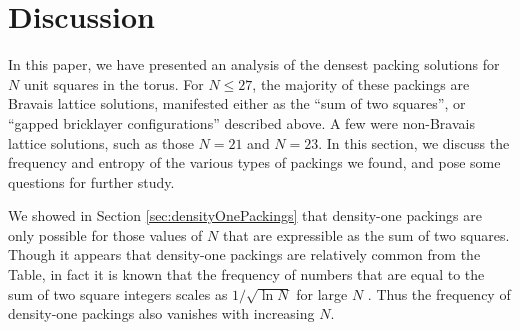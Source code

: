 \documentclass[preprint,aps]{revtex4}
\begin{document}
%
%
\section{Discussion}
\label{sec:discussion}

In this paper, we have presented an analysis of the densest packing solutions for $N$ unit squares in the torus.  For $N \leq 27$, the majority of these packings are Bravais lattice solutions, manifested either as the ``sum of two squares'', or ``gapped bricklayer configurations'' described above. A few were non-Bravais lattice solutions, such as those $N=21$ and $N=23$. In this section, we discuss the frequency and entropy of the various types of packings we found, and pose some questions for further study.

We showed in Section \ref{sec:densityOnePackings} that density-one packings are only possible for those values of $N$ that are expressible as the sum of two squares. 
Though it appears that density-one packings are relatively common from the Table, in fact it is known that the frequency of numbers that are equal to the sum of two square integers scales as $1/\sqrt{\ln N}$ for large $N$ \cite{Berndt1993,Landau1909}.
Thus the frequency of density-one packings also vanishes with increasing $N$.
\end{document}
